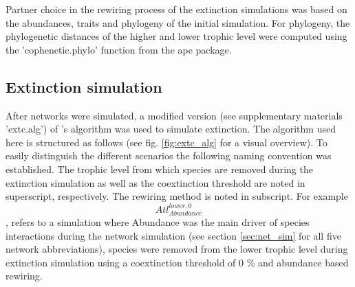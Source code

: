 \documentclass[12pt,a4paper]{article}
\begin{document}
	Partner choice in the rewiring process of the extinction simulations was based on the abundances, traits and phylogeny of the initial simulation. For phylogeny, the phylogenetic distances of the higher and lower trophic level were computed using the 'cophenetic.phylo' function from the ape package.
	\subsection{Extinction simulation} \label{sec:extc_sim}
	After networks were simulated, a modified version (see supplementary materials 'extc.alg') of \citeauthor{Vizentin-Bugoni2019}'s algorithm was used to simulate extinction. The algorithm used here is structured as follows (see fig. \ref{fig:extc_alg} for a visual overview). To easily distinguish the different scenarios the following naming convention was established. The trophic level from which species are removed during the extinction simulation as well as the coextinction threshold are noted in superscript, respectively. The rewiring method is noted in subscript. For example \[Atl^{lower, 0}_{Abundance}\], refers to a simulation where Abundance was the main driver of species interactions during the network simulation (see section \ref{sec:net_sim} for all five network abbreviations), species were removed from the lower trophic level during extinction simulation using a coextinction threshold of 0 \% and abundance based rewiring.
\end{document}
